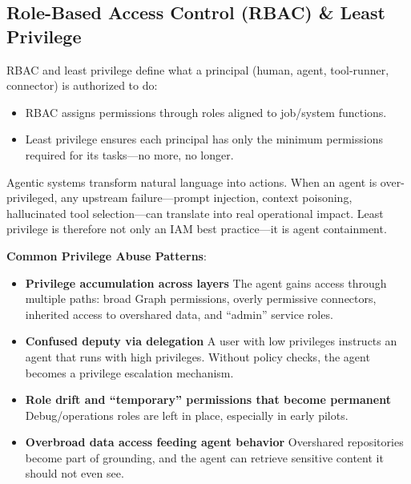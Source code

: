 \begin{TNtwocol}
    \section{Role-Based Access Control (RBAC) & Least Privilege}

    RBAC and least privilege define what a principal (human, agent, tool-runner, connector) is authorized to do:
    \begin{itemize}
        \item RBAC assigns permissions through roles aligned to job/system functions.
        \item Least privilege ensures each principal has only the minimum permissions required for its tasks—no more, no longer.
    \end{itemize}

    Agentic systems transform natural language into actions. When an agent is over-privileged, any upstream failure—prompt injection, context poisoning, hallucinated tool selection—can translate into real operational impact. Least privilege is therefore not only an IAM best practice—it is agent containment.

    \textbf{Common Privilege Abuse Patterns}:
    \begin{itemize}
        \item \textbf{Privilege accumulation across layers} The agent gains access through multiple paths: broad Graph permissions, overly permissive connectors, inherited access to overshared data, and “admin” service roles.
        \item \textbf{Confused deputy via delegation} A user with low privileges instructs an agent that runs with high privileges. Without policy checks, the agent becomes a privilege escalation mechanism.
        \item \textbf{Role drift and “temporary” permissions that become permanent} Debug/operations roles are left in place, especially in early pilots.
        \item \textbf{Overbroad data access feeding agent behavior} Overshared repositories become part of grounding, and the agent can retrieve sensitive content it should not even see.
    \end{itemize}


\end{TNtwocol}
